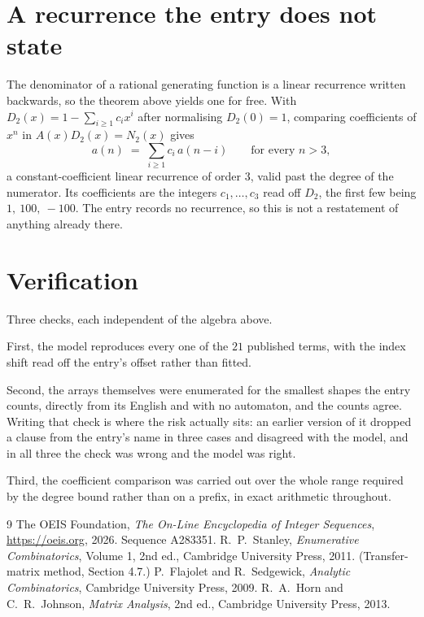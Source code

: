 \documentclass[11pt,a4paper]{article}
\theoremstyle{plain}
\theoremstyle{definition}
\begin{document}
\section{A recurrence the entry does not state}

The denominator of a rational generating function is a linear recurrence written backwards, so
the theorem above yields one for free. With $D_2(x)=1-\sum_{i\ge1}c_ix^i$ after normalising
$D_2(0)=1$, comparing coefficients of $x^n$ in $A(x)D_2(x)=N_2(x)$ gives
\[
a(n)\;=\;\sum_{i\ge1}c_i\,a(n-i)\qquad\text{for every }n>3,
\]
a constant-coefficient linear recurrence of order $3$, valid past the degree of the
numerator. Its coefficients are the integers $c_1,\dots,c_{3}$ read off $D_2$, the first few being $1,\ 100,\ -100$. The entry records no recurrence, so this is not a restatement of anything
already there.

\section{Verification}

Three checks, each independent of the algebra above.

First, the model reproduces every one of the $21$ published terms, with the index shift
read off the entry's offset rather than fitted.

Second, the arrays themselves were enumerated for the smallest shapes the entry counts,
directly from its English and with no automaton, and the counts agree. Writing that check is
where the risk actually sits: an earlier version of it dropped a clause from the entry's name
in three cases and disagreed with the model, and in all three the check was wrong and the model
was right.

Third, the coefficient comparison was carried out over the whole range required by the degree
bound rather than on a prefix, in exact arithmetic throughout.

\begin{thebibliography}{9}
 The OEIS Foundation, \emph{The On-Line Encyclopedia of Integer
Sequences}, \url{https://oeis.org}, 2026. Sequence A283351.
 R.~P.~Stanley, \emph{Enumerative Combinatorics}, Volume 1, 2nd ed.,
Cambridge University Press, 2011. (Transfer-matrix method, Section 4.7.)
 P.~Flajolet and R.~Sedgewick, \emph{Analytic Combinatorics}, Cambridge
University Press, 2009.
 R.~A.~Horn and C.~R.~Johnson, \emph{Matrix Analysis}, 2nd ed., Cambridge
University Press, 2013.
\end{thebibliography}
\end{document}
